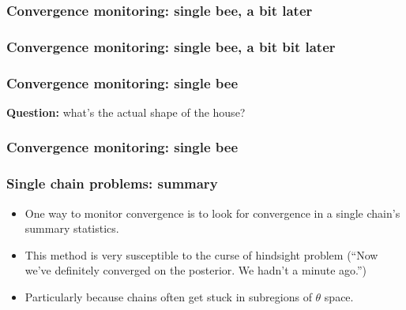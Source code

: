 \documentclass[handout]{beamer}
\begin{document}
\begin{frame}
\frametitle{Convergence monitoring: single bee, a bit later}

\begin{figure}[t]
\centerline{}
\end{figure}

\end{frame}

\begin{frame}
\frametitle{Convergence monitoring: single bee, a bit bit later}

\begin{figure}[t]
\centerline{}
\end{figure}

\end{frame}

\begin{frame}
\frametitle{Convergence monitoring: single bee}
\Large \textbf{Question:} what's the actual shape of the house?

\end{frame}


\begin{frame}
\frametitle{Convergence monitoring: single bee}

\begin{figure}[t]
\centerline{}
\end{figure}

\end{frame}

\begin{frame}
\frametitle{Single chain problems: summary}

\begin{itemize}
\item<2-> One way to monitor convergence is to look for convergence in a single chain's summary statistics.
\item<3-> This method is very susceptible to the curse of hindsight problem (``Now we've definitely converged on the posterior. We hadn't a minute ago.'')
\item<4-> Particularly because chains often get stuck in subregions of $\theta$ space. 
\end{itemize}

\end{frame}
\end{document}
